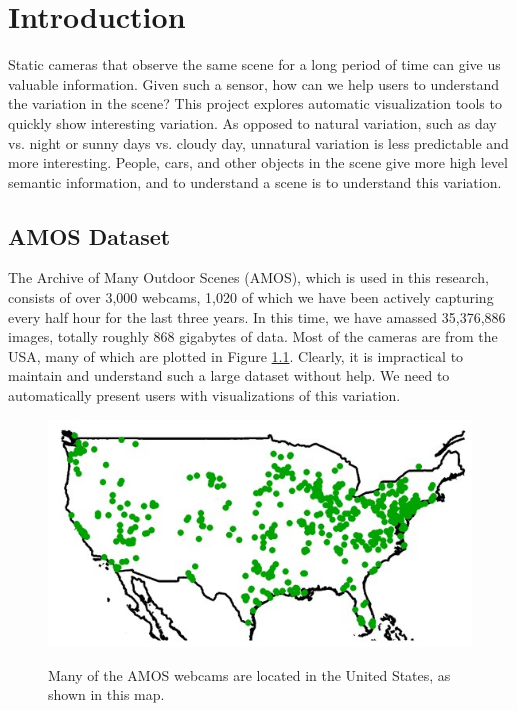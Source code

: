 \chapter{Introduction}
\label{cpt:intro}

Static cameras that observe the same scene for a long period of time can give us valuable information.  Given such a sensor, how can we help users to understand the variation in the scene?  This project explores automatic visualization tools to quickly show interesting variation.  As opposed to natural variation, such as day vs. night or sunny days vs. cloudy day, unnatural variation is less predictable and more interesting.  People, cars, and other objects in the scene give more high level semantic information, and to understand a scene is to understand this variation.


\section{AMOS Dataset}

The Archive of Many Outdoor Scenes (AMOS), which is used in this research, consists of over 3,000 webcams, 1,020 of which we have been actively capturing every half hour for the last three years.  In this time, we have amassed 35,376,886 images, totally roughly 868 gigabytes of data.  Most of the cameras are from the USA, many of which are plotted in Figure \ref{fig:localizationMap}.  Clearly, it is impractical to maintain and understand such a large dataset without help.  We need to automatically present users with visualizations of this variation.

\begin{figure}[ht]
\centering
\includegraphics[width = 1\textwidth]{figures/localizationMap.jpg}
\label{fig:localizationMap}
\caption[Map of known webcam locations from the AMOS dataset.]{Many of the AMOS webcams are located in the United States, as shown in this map.}
\end{figure}



